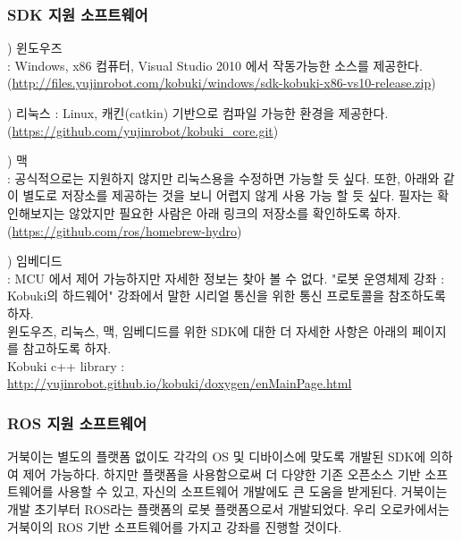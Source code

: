 \subsubsection{SDK 지원 소프트웨어}

\setcounter{num}{0}

\vspace{\baselineskip}
\noindent
{}
) 윈도우즈\\
: Windows, x86 컴퓨터, Visual Studio 2010 에서 작동가능한 소스를 제공한다.\\  
(\url{http://files.yujinrobot.com/kobuki/windows/sdk-kobuki-x86-vs10-release.zip})

\vspace{\baselineskip}
\noindent
{}
) 리눅스 
: Linux, 캐킨(catkin) 기반으로 컴파일 가능한 환경을 제공한다.\\
(\url{https://github.com/yujinrobot/kobuki_core.git})

\vspace{\baselineskip}
\noindent
{}
) 맥\\
: 공식적으로는 지원하지 않지만 리눅스용을 수정하면 가능할 듯 싶다. 또한, 아래와 같이 별도로 저장소를 제공하는 것을 보니 어렵지 않게 사용 가능 할 듯 싶다. 필자는 확인해보지는 않았지만 필요한 사람은 아래 링크의 저장소를 확인하도록 하자.\\
(\url{https://github.com/ros/homebrew-hydro})

\vspace{\baselineskip}
\noindent
{}
) 임베디드\\
: MCU 에서 제어 가능하지만 자세한 정보는 찾아 볼 수 없다. "로봇 운영체제 강좌 : Kobuki의 하드웨어" 강좌에서 말한 시리얼 통신을 위한 통신 프로토콜을 참조하도록 하자.\\

윈도우즈, 리눅스, 맥, 임베디드를 위한 SDK에 대한 더 자세한 사항은 아래의 페이지를 참고하도록 하자.\\
Kobuki c++ library : \url{http://yujinrobot.github.io/kobuki/doxygen/enMainPage.html}

\subsubsection{ROS 지원 소프트웨어}

거북이는 별도의 플랫폼 없이도 각각의 OS 및 디바이스에 맞도록 개발된 SDK에 의하여 제어 가능하다. 하지만 플랫폼을 사용함으로써 더 다양한 기존 오픈소스 기반 소프트웨어를 사용할 수 있고, 자신의 소프트웨어 개발에도 큰 도움을 받게된다. 거북이는 개발 초기부터 ROS라는 플랫폼의 로봇 플랫폼으로서 개발되었다. 우리 오로카에서는 거북이의 ROS 기반 소프트웨어를 가지고 강좌를 진행할 것이다.
 
